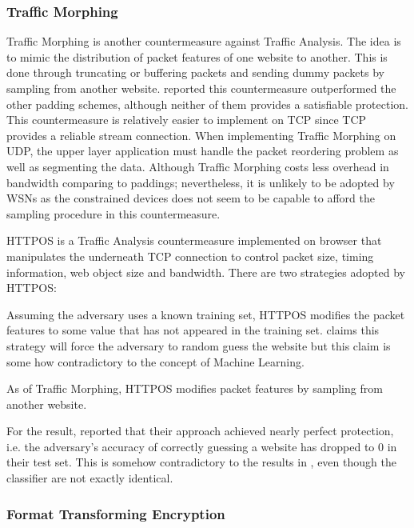 \subsubsection{Traffic Morphing}

Traffic Morphing\cite{TrafficMorphing} is another countermeasure against Traffic Analysis. The idea is to mimic the distribution of packet features of one website to another. This is done through truncating or buffering packets and sending dummy packets by sampling from another website. \cite{Peekaboo} reported this countermeasure outperformed the other padding schemes, although neither of them provides a satisfiable protection. This countermeasure is relatively easier to implement on TCP since TCP provides a reliable stream connection. When implementing Traffic Morphing on UDP, the upper layer application must handle the packet reordering problem as well as segmenting the data. Although Traffic Morphing costs less overhead in bandwidth comparing to paddings; nevertheless, it is unlikely to be adopted by WSNs as the constrained devices does not seem to be capable to afford the sampling procedure in this countermeasure.

HTTPOS\cite{HTTPOS} is a Traffic Analysis countermeasure implemented on browser that manipulates the underneath TCP connection to control packet size, timing information, web object size and bandwidth. There are two strategies adopted by HTTPOS:
\begin{description}[style=nextline]
	\item[The Diffusion Strategy]
	 Assuming the adversary uses a known training set, HTTPOS modifies the packet features to some value that has not appeared in the training set. \cite{HTTPOS} claims this strategy will force the adversary to random guess the website but this claim is some how contradictory to the concept of Machine Learning.
	\item[The Confusion Strategy]
	As of Traffic Morphing, HTTPOS modifies packet features by sampling from another website.
\end{description}

For the result, \cite{HTTPOS} reported that their approach achieved nearly perfect protection, i.e. the adversary's accuracy of correctly guessing a website has  dropped to 0 in their test set. This is somehow contradictory to the results in \cite{Peekaboo}, even though the classifier are not exactly identical.

\subsubsection{Format Transforming Encryption}

